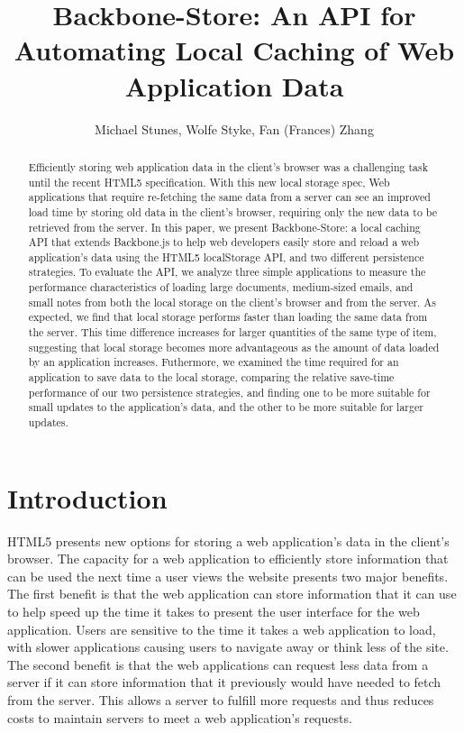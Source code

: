 \documentclass[12pt]{article}
\title{Backbone-Store: An API for Automating Local Caching of Web Application
Data}
\author{Michael Stunes, Wolfe Styke, Fan (Frances) Zhang}
\begin{document}
\maketitle

\begin{abstract}
Efficiently storing web application data in the client's browser was a
challenging task until the recent HTML5 specification. With this new local storage spec, Web applications that require re-fetching the same data from a server
can see an improved load time by storing old data in the client's browser,
requiring only the new data to be retrieved from the server. In this paper, we present Backbone-Store: a local caching API that extends Backbone.js to help web developers easily store and reload a web application's data using the HTML5 localStorage API, and two different persistence strategies. To evaluate the API,  we analyze three simple applications to measure the performance characteristics of loading large
documents, medium-sized emails, and small notes from both the local storage on
the client's browser and from the server. As expected, we find that local storage performs
faster than loading the same data from the server. This time difference
increases for larger quantities of the same type of item, suggesting that local storage becomes more advantageous as the amount of data loaded by an application increases. %
Futhermore, we examined the time required for an application to save data to the local storage, comparing the relative save-time performance of our two persistence strategies, and finding one to be more suitable for small updates to the application's data, and the other to be more suitable for larger updates.
\end{abstract}

\section{Introduction}

HTML5 presents new options for storing a web application's data in the client's
browser. The capacity for a web application to efficiently store information
that can be used the next time a user views the website presents two major
benefits. The first benefit is that the web application can store information
that it can use to help speed up the time it takes to present the user
interface for the web application. Users are sensitive to the time it takes a
web application to load, with slower applications causing users to navigate
away or think less of the site. The second benefit is that the web applications
can request less data from a server if it can store information that it
previously would have needed to fetch from the server. This allows a server to
fulfill more requests and thus reduces costs to maintain servers to meet a web
application's requests.
\end{document}
